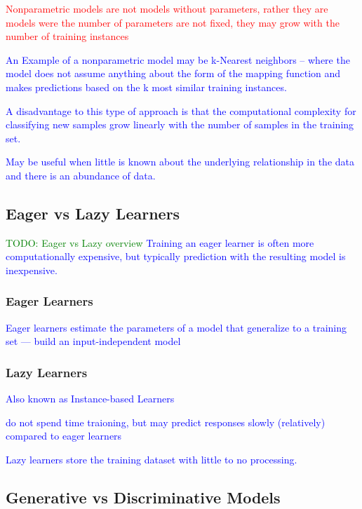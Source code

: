 \textcolor{red}{Nonparametric models are not models without parameters, rather they are models were the number of parameters are not fixed, they may grow with the number of training instances}

\textcolor{blue}{An Example of a nonparametric model may be k-Nearest neighbors -- where the model does not assume anything about the form of the mapping function and makes predictions based on the k most similar training instances.}

\textcolor{blue}{A disadvantage to this type of approach is that the computational complexity for classifying new samples grow linearly with the number of samples in the training set.}

\textcolor{blue}{May be useful when little is known about the underlying relationship in the data and there is an abundance of data.}

\subsection{Eager vs Lazy Learners}

\textcolor{green}{TODO: Eager vs Lazy overview}
\textcolor{blue}{Training an eager learner is often more computationally expensive, but typically prediction with the resulting model is inexpensive.}

\subsubsection{Eager Learners}

\textcolor{blue}{Eager learners estimate the parameters of a model that generalize to a training set --- build an input-independent model}

\subsubsection{Lazy Learners}

\textcolor{blue}{Also known as Instance-based Learners}

\textcolor{blue}{do not spend time traioning, but may predict responses slowly (relatively) compared to eager learners}

\textcolor{blue}{Lazy learners store the training dataset with little to no processing.}


\subsection{Generative vs Discriminative Models}

